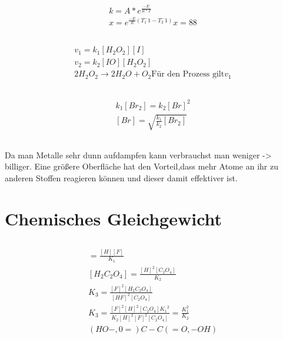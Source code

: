 \documentclass[a4paper]{article}
\begin{document}
\subsection{}
\begin{align}
  k=A*e^{\frac{-E}{R*T}}\\
  x=e^{\frac{-E}{R}(T_1^-1-T_2^-1)}
  x=88
\end{align}

\subsection{}
\begin{align}
  v_1=k_1 [H_2O_2][I]\\
  v_2=k_2 [IO][H_2O_2]\\
  2 H_2O_2 \rightarrow 2 H_2O + O_2
  \text{Für den Prozess gilt} v_1
\end{align}

\subsection{}
\begin{align}
  k_1[Br_2]=k_2[Br]^2\\
  [Br]=\sqrt{\frac{k_1}{k_2}[Br_2]}
\end{align}

\subsection{}
Da man Metalle sehr dunn aufdampfen kann verbrauchst man weniger -> billiger. Eine größere Oberfläche hat den Vorteil,dass mehr Atome an ihr zu anderen Stoffen reagieren können und dieser damit effektiver ist.

\section{Chemisches Gleichgewicht}
\subsection{}
\begin{align}
  [HF]=\frac{[H][F]}{K_1}\\
  [H_2C_2O_4]=\frac{[H]^2[C_2O_4]}{K_2}\\
  K_{3}=\frac{[F]^2[H_2C_2O_4]}{[HF]^2[C_2O_4]}\\
  K_3=\frac{[F]^2 [H]^2 [C_2O_4] {K_1}^2}{K_2 [H]^2 [F]^2 [C_2O_4]}=\frac{K_1^2}{K_2}\\
  (HO-,0=)C-C(=O,-OH)\\
\end{align}
\end{document}
